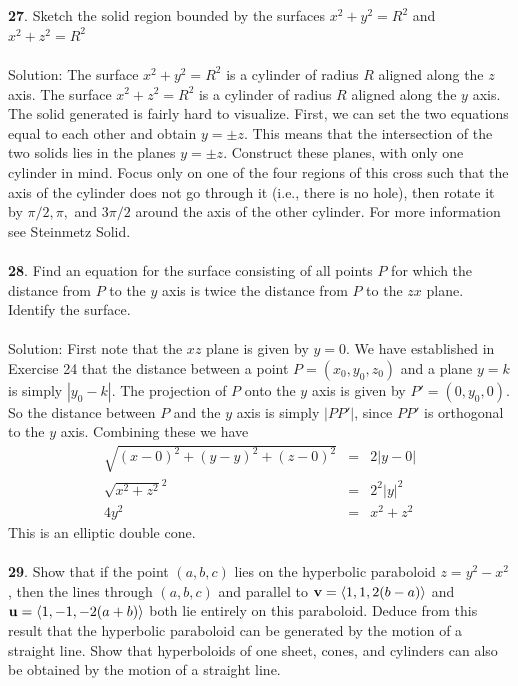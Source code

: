 \documentclass[12pt]{amsbook}
\newcommand{\la}{\langle}
\newcommand{\ra}{\rangle}
\begin{document}
\\
\\
{\small\bf 27}.  Sketch the solid region bounded by 
the surfaces $x^2+y^2=R^2$ and $x^2+z^2=R^2$\\
\\
{\sc Solution}: The surface $x^2+y^2=R^2$ is a cylinder of radius $R$ aligned along the $z$ axis. The surface $x^2+z^2=R^2$ is a cylinder of radius $R$ aligned along the $y$ axis. The solid generated is fairly hard to visualize. First, we can set the two equations equal to each other and obtain $y=\pm z$. This means that the intersection of the two solids lies in the planes $y=\pm z$. Construct these planes, with only one cylinder in mind. Focus only on one of the four regions of this cross such that the axis of the cylinder does not go through it (i.e., there is no hole), then rotate it by $\pi/2, \pi, $ and $3\pi/2$ around the axis of the other cylinder. For more information see Steinmetz Solid. 
\\
\\
{\small\bf 28}.  Find an equation for the surface consisting of all
points $P$ for which the distance from $P$ to the $y$ axis is
twice the distance from $P$ to the $zx$ plane. Identify the
surface.\\
\\
{\sc Solution}: First note that the $xz$ plane is given by $y=0$. We have established in Exercise 24 that the distance between a point $P=(x_0,y_0,z_0)$ and a plane $y=k$ is simply $|y_0-k|$. The projection of $P$ onto the $y$ axis is given by $P'=(0,y_0,0)$. So the distance between $P$ and the $y$ axis is simply $|PP'|$, since $PP'$ is orthogonal to the $y$ axis.  Combining these we have
\begin{eqnarray*}
\sqrt{(x-0)^2+(y-y)^2+(z-0)^2}&=&2|y-0|\\
\sqrt{x^2+z^2}^2&=&2^2|y|^2\\
4y^2&=&x^2+z^2
\end{eqnarray*}
This is an elliptic double cone.
\\
\\
{\small\bf 29}.  Show that if the point $(a,b,c)$ lies on the hyperbolic
paraboloid $z=y^2-x^2$, then the lines through $(a,b,c)$ and
parallel to ${\bf v}=\la 1,1,2(b-a)\ra$ and ${\bf u}=\la
1,-1,-2(a+b)\ra$ both lie entirely on this paraboloid. Deduce from
this result that the hyperbolic paraboloid can be generated by the
motion of a straight line. Show that hyperboloids of one sheet,
cones, and cylinders can also be obtained by the motion of a
straight line.
\end{document}
